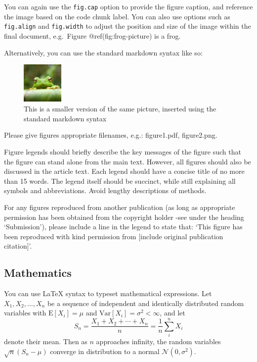 \documentclass[9pt,a4paper,]{extarticle}
\begin{document}
You can again use the \texttt{fig.cap} option to provide the figure caption, and reference the image based on the code chunk label. You can also use options such as \texttt{fig.align} and \texttt{fig.width} to adjust the position and size of the image within the final document, e.g.~Figure @ref(fig:frog-picture) is a frog.

Alternatively, you can use the standard markdown syntax like so:

\begin{figure}
\centering
\includegraphics[width=2cm,height=2cm]{frog.jpg}
\caption{This is a smaller version of the same picture, inserted using the standard markdown syntax}
\end{figure}

Please give figures appropriate filenames, e.g.: figure1.pdf, figure2.png.

Figure legends should briefly describe the key messages of the figure such that the figure can stand alone from the main text. However, all figures should also be discussed in the article text. Each legend should have a concise title of no more than 15 words. The legend itself should be succinct, while still explaining all symbols and abbreviations. Avoid lengthy descriptions of methods.

For any figures reproduced from another publication (as long as appropriate permission has been obtained from the copyright holder -see under the heading `Submission'), please include a line in the legend to state that: `This figure has been reproduced with kind permission from {[}include original publication citation{]}'.

\hypertarget{mathematics}{%
\subsection{Mathematics}\label{mathematics}}

You can use LaTeX syntax to typeset mathematical expressions. Let \(X_1, X_2, \ldots, X_n\) be a sequence of independent and identically distributed random variables with \(\text{E}[X_i] = \mu\) and \(\text{Var}[X_i] = \sigma^2 < \infty\), and let
\[S_n = \frac{X_1 + X_2 + \cdots + X_n}{n}
      = \frac{1}{n}\sum_{i}^{n} X_i\]
denote their mean. Then as \(n\) approaches infinity, the random variables \(\sqrt{n}(S_n - \mu)\) converge in distribution to a normal \(\mathcal{N}(0, \sigma^2)\).
\end{document}
